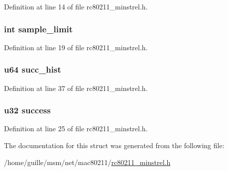 Definition at line 14 of file rc80211\-\_\-minstrel.\-h.

\hypertarget{structminstrel__rate_ada7982d82ef4893b92944d7b8c871dd2}{
\subsubsection[{sample\-\_\-limit}]{\setlength{\rightskip}{0pt plus 5cm}int sample\-\_\-limit}}\label{structminstrel__rate_ada7982d82ef4893b92944d7b8c871dd2}


Definition at line 19 of file rc80211\-\_\-minstrel.\-h.

\hypertarget{structminstrel__rate_af2ad78ee531872588a173945378c1b51}{
\subsubsection[{succ\-\_\-hist}]{\setlength{\rightskip}{0pt plus 5cm}u64 succ\-\_\-hist}}\label{structminstrel__rate_af2ad78ee531872588a173945378c1b51}


Definition at line 37 of file rc80211\-\_\-minstrel.\-h.

\hypertarget{structminstrel__rate_a59c45b017ad3e668a0aadd1fb16dabf3}{
\subsubsection[{success}]{\setlength{\rightskip}{0pt plus 5cm}u32 success}}\label{structminstrel__rate_a59c45b017ad3e668a0aadd1fb16dabf3}


Definition at line 25 of file rc80211\-\_\-minstrel.\-h.



The documentation for this struct was generated from the following file\-:\begin{DoxyCompactItemize}
\item 
/home/guille/msm/net/mac80211/\hyperlink{rc80211__minstrel_8h}{rc80211\-\_\-minstrel.\-h}\end{DoxyCompactItemize}
